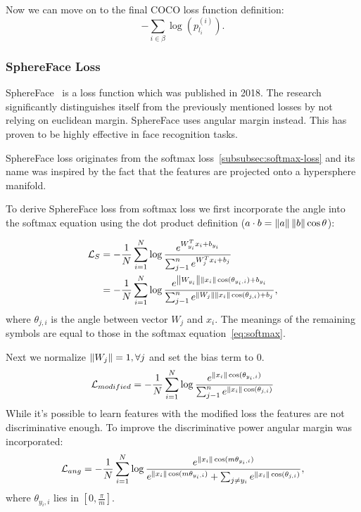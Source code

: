 Now we can move on to the final COCO loss function definition:
\begin{equation}
    - \sum_{i \in \beta} \log \left( p_{l_i}^{(i)} \right).
\end{equation}

\subsubsection{SphereFace Loss}
SphereFace~\cite{SphereFace} is a loss function which was published in 2018.
The research significantly distinguishes itself from the previously mentioned losses by not relying on euclidean margin.
SphereFace uses angular margin instead.
This has proven to be highly effective in face recognition tasks.

SphereFace loss originates from the softmax loss~\ref{subsubsec:softmax-loss} and its name was inspired by the fact
that the features are projected onto a hypersphere manifold.

To derive SphereFace loss from softmax loss we first incorporate the angle into the softmax equation using the dot
product definition ($a \cdot b = \left\lVert a\right\rVert \left\lVert b\right\rVert \cos \theta$):

\begin{align*}
    \mathcal{L}_S &= -\frac{1}{N} \sum_{i=1}^{N} \log \frac{e^{W^T_{y_i} x_{i} + b_{y_i}}}
    {\sum_{j-1}^{n} e^{W^T_{j} x_{i} + b_{j}}} \\
    &= -\frac{1}{N} \sum_{i=1}^{N} \log \frac{e^{\left\lVert W_{y_i}\right\rVert \left\lVert x_i\right\rVert \cos(\theta_{y_i,i}) + b_{y_i}}}
    {\sum_{j-1}^{n} e^{\left\lVert W_j\right\rVert \left\lVert x_{i}\right\rVert \cos(\theta_{j,i}) + b_{j}}},
\end{align*}
where $\theta_{j,i}$ is the angle between vector $W_j$ and $x_i$.
The meanings of the remaining symbols are equal to those in the softmax equation~\ref{eq:softmax}.


Next we normalize $\left\lVert W_j\right\rVert = 1, \forall j$ and set the bias term to 0.
\begin{equation}
    \mathcal{L}_{modified} = -\frac{1}{N} \sum_{i=1}^{N} \log \frac{e^{\left\lVert x_i\right\rVert \cos(\theta_{y_i,i})}}
    {\sum_{j-1}^{n} e^{\left\lVert x_{i}\right\rVert \cos(\theta_{j,i})}}
\end{equation}
While it's possible to learn features with the modified loss the features are not discriminative enough.
To improve the discriminative power angular margin was incorporated:
\begin{equation}
    \label{eq:ang}
    \mathcal{L}_{ang} = -\frac{1}{N} \sum_{i=1}^{N} \log \frac{e^{\left\lVert x_i\right\rVert \cos(m\theta_{y_i,i})}}
    {e^{\left\lVert x_i\right\rVert \cos(m\theta_{y_i,i})} + \sum_{j \neq y_i} e^{\left\lVert x_{i}\right\rVert \cos(\theta_{j,i})}},
\end{equation}
where $\theta_{y_i,i}$ lies in $\left[ 0, \frac{\pi}{m} \right]$.

